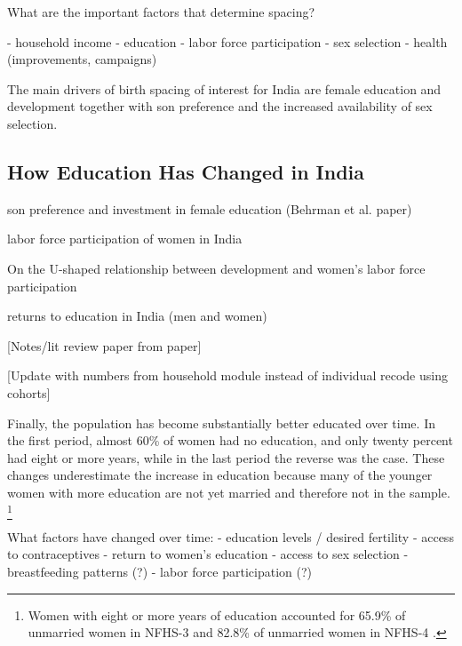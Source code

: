 What are the important factors that determine spacing?

- household income
- education
- labor force participation
- sex selection
- health (improvements, campaigns)

The main drivers of birth spacing of interest for India are female education and
development together with son preference and the increased availability of sex selection.




\subsection{How Education Has Changed in India}

son preference and investment in female education (Behrman et al. paper)

labor force participation of women in India


\citep{Jensen2012}
\citep{Behrman2017}
\citep{Chatterjee2018}

On the U-shaped relationship between development and women's labor force participation \citep{Goldin1994}



returns to education in India (men and women)

[Notes/lit review paper from paper]

[Update with numbers from household module instead of individual recode using cohorts]

Finally, the population has become substantially better educated over time.
In the first period, almost 60\% of women had no education, and only twenty percent had
eight or more years, while in the last period the reverse was the case.
These changes underestimate the increase in education because many of the younger women 
with more education are not yet married and therefore not in the sample.%
\footnote{
Women with eight or more years of education accounted for 65.9\% of
unmarried women in NFHS-3 and 82.8\% of unmarried women in NFHS-4
\citep{International-Institute-for-Population-Sciences-IIPS2007,International-Institute-for-Population-Sciences-IIPS2017}.
}



What factors have changed over time:
    - education levels / desired fertility
    - access to contraceptives
    - return to women's education
    - access to sex selection
    - breastfeeding patterns (?)
    - labor force participation (?)


